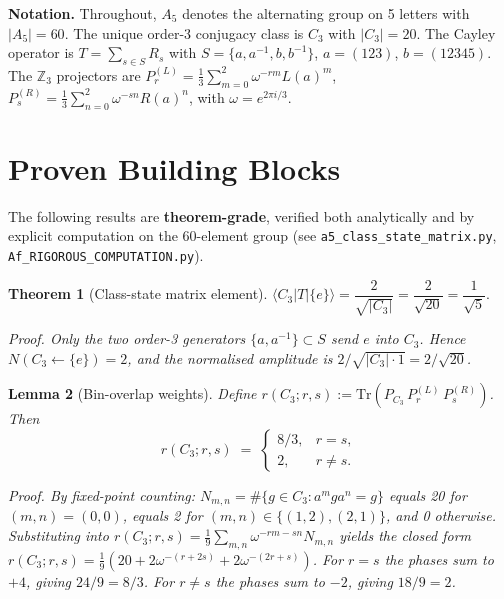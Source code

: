 \documentclass[11pt]{article}
\newtheorem{theorem}{Theorem}
\newtheorem{lemma}[theorem]{Lemma}
\theoremstyle{remark}
\begin{document}
\medskip
\noindent\textbf{Notation.}
Throughout, $A_5$ denotes the alternating group on 5 letters with $|A_5| = 60$.
The unique order-3 conjugacy class is $C_3$ with $|C_3| = 20$.
The Cayley operator is $T = \sum_{s \in S} R_s$ with $S = \{a, a^{-1}, b, b^{-1}\}$, $a = (123)$, $b = (12345)$.
The $\mathbb{Z}_3$ projectors are $P_r^{(L)} = \frac{1}{3}\sum_{m=0}^{2} \omega^{-rm} L(a)^m$, $P_s^{(R)} = \frac{1}{3}\sum_{n=0}^{2} \omega^{-sn} R(a)^n$, with $\omega = e^{2\pi i/3}$.

\section{Proven Building Blocks}

The following results are \textbf{theorem-grade}, verified both analytically and by explicit computation on the 60-element group (see \texttt{a5\_class\_state\_matrix.py}, \texttt{Af\_RIGOROUS\_COMPUTATION.py}).

\begin{theorem}[Class-state matrix element]\label{thm:class-state}
$\langle C_3 | T | \{e\} \rangle = \dfrac{2}{\sqrt{|C_3|}} = \dfrac{2}{\sqrt{20}} = \dfrac{1}{\sqrt{5}}.$

\noindent\textit{Proof.}
Only the two order-3 generators $\{a, a^{-1}\} \subset S$ send $e$ into $C_3$.
Hence $N(C_3 \leftarrow \{e\}) = 2$, and the normalised amplitude is $2/\sqrt{|C_3|\cdot 1} = 2/\sqrt{20}$.
\end{theorem}

\begin{lemma}[Bin-overlap weights]\label{lem:bin-overlap}
Define $r(C_3; r, s) := \mathrm{Tr}(P_{C_3}\, P_r^{(L)}\, P_s^{(R)})$.  Then
\[
r(C_3; r, s) \;=\;
\begin{cases}
  8/3, & r = s, \\
  2,   & r \neq s.
\end{cases}
\]

\noindent\textit{Proof.}
By fixed-point counting: $N_{m,n} = \#\{g \in C_3 : a^m g a^n = g\}$ equals 20 for $(m,n) = (0,0)$, equals 2 for $(m,n) \in \{(1,2),(2,1)\}$, and 0 otherwise.
Substituting into $r(C_3;r,s) = \frac{1}{9}\sum_{m,n} \omega^{-rm-sn} N_{m,n}$ yields the closed form
$r(C_3;r,s) = \frac{1}{9}(20 + 2\omega^{-(r+2s)} + 2\omega^{-(2r+s)})$.
For $r = s$ the phases sum to $+4$, giving $24/9 = 8/3$.
For $r \neq s$ the phases sum to $-2$, giving $18/9 = 2$.
\end{lemma}
\end{document}
